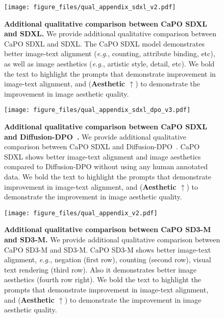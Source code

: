 \newpage
\begin{figure}[!htb]
    \small\centering
    \texttt{[image: figure\_files/qual\_appendix\_sdxl\_v2.pdf]}
    \vspace{-10pt}
    \caption{
    \textbf{Additional qualitative comparison between CaPO SDXL and SDXL.}
    We provide additional qualitative comparison between CaPO SDXL and SDXL. The CaPO SDXL model demonstrates better image-text alignment (\emph{e.g.}, counting, attribute binding, etc), as well as image aesthetics (\emph{e.g.}, artistic style, detail, etc). We bold the text to highlight the prompts that demonstrate improvement in image-text alignment, and ({\bf Aesthetic $\uparrow$}) to demonstrate the improvement in image aesthetic quality.
    }
    \label{fig:qual_sdxl}
    \vspace{-20pt}
\end{figure}
\newpage
\begin{figure}[!htb]
    \small\centering
    \texttt{[image: figure\_files/qual\_appendix\_sdxl\_dpo\_v3.pdf]}
    \vspace{-10pt}
    \caption{
    \textbf{Additional qualitative comparison between CaPO SDXL and Diffusion-DPO~\citep{wallace2023diffusion}.}
    We provide additional qualitative comparison between CaPO SDXL and Diffusion-DPO~\citep{wallace2023diffusion}. 
    CaPO SDXL shows better image-text alignment and image aesthetics compared to Diffusion-DPO without using any human annotated data.
    We bold the text to highlight the prompts that demonstrate improvement in image-text alignment, and ({\bf Aesthetic $\uparrow$}) to demonstrate the improvement in image aesthetic quality.
    }
    \label{fig:qual_sdxl_dpo}
    \vspace{-20pt}
\end{figure}
\newpage
\begin{figure}[!htb]
    \small\centering
    \texttt{[image: figure\_files/qual\_appendix\_v2.pdf]}
    \vspace{-10pt}
    \caption{
    \textbf{Additional qualitative comparison between CaPO SD3-M and SD3-M.}
    We provide additional qualitative comparison between CaPO SD3-M and SD3-M. CaPO SD3-M shows better image-text alignment, \emph{e.g.}, negation (first row), counting (second row), visual text rendering (third row). Also it demonstrates better image aesthetics (fourth row right).
    We bold the text to highlight the prompts that demonstrate improvement in image-text alignment, and ({\bf Aesthetic $\uparrow$}) to demonstrate the improvement in image aesthetic quality.
    }
    \label{fig:qual_sd3m}
    \vspace{-20pt}
\end{figure}



\vspace{10pt}

